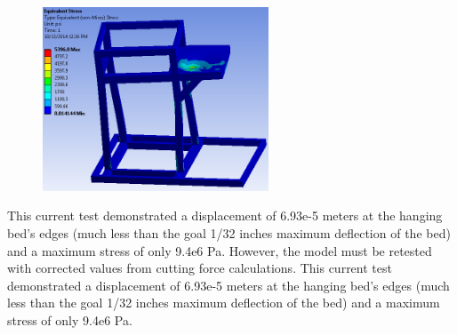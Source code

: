 \begin{figure}[H]
    \centering
    \includegraphics[width=0.6\textwidth]{./fall-report pictures/Chapter3-Calculations/mp2}
    \label{fig:MM2}
\end{figure}

This current test demonstrated a displacement of 6.93e-5 meters at the hanging bed’s edges (much less than the goal 1/32 inches maximum deflection of the bed) and a maximum stress of only 9.4e6 Pa. However, the model must be retested with corrected values from cutting force calculations. This current test demonstrated a displacement of 6.93e-5 meters at the hanging bed’s edges (much less than the goal 1/32 inches maximum deflection of the bed) and a maximum stress of only 9.4e6 Pa.


